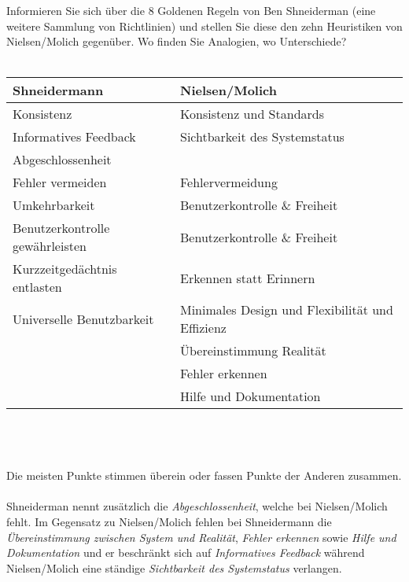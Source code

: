 \begin{exercise}
  Informieren Sie sich über die 8 Goldenen Regeln von Ben Shneiderman 
  (eine weitere Sammlung von Richtlinien) und stellen Sie diese den zehn Heuristiken von Nielsen/Molich gegenüber. 
  Wo finden Sie Analogien, wo Unterschiede?
  \\\\
\end{exercise}
\begin{tabularx}{\textwidth}{|X|X|}
  \hline
  \textbf{Shneidermann} & \textbf{Nielsen/Molich}\\
  \hline
  Konsistenz & Konsistenz und Standards\\
  \hline
  Informatives Feedback & Sichtbarkeit des Systemstatus\\
  \hline
  Abgeschlossenheit & \\
  \hline
  Fehler vermeiden & Fehlervermeidung\\
  \hline
  Umkehrbarkeit & Benutzerkontrolle \& Freiheit\\
  \hline
  Benutzerkontrolle gewährleisten & Benutzerkontrolle \& Freiheit\\
  \hline
  Kurzzeitgedächtnis entlasten & Erkennen statt Erinnern\\
  \hline
  Universelle Benutzbarkeit & Minimales Design und Flexibilität und Effizienz\\
  \hline
  & Übereinstimmung Realität\\
  \hline
  & Fehler erkennen\\
  \hline
  & Hilfe und Dokumentation\\
  \hline
\end{tabularx}
\\\\\\
Die meisten Punkte stimmen überein oder fassen Punkte der Anderen zusammen.\\\\
Shneiderman nennt zusätzlich die \textit{Abgeschlossenheit}, 
welche bei Nielsen/Molich fehlt.
Im Gegensatz zu Nielsen/Molich fehlen bei Shneidermann die \textit{Übereinstimmung zwischen System und Realität}, 
\textit{Fehler erkennen} sowie \textit{Hilfe und Dokumentation} und er beschränkt sich auf \textit{Informatives Feedback}
während Nielsen/Molich eine ständige \textit{Sichtbarkeit des Systemstatus} verlangen.